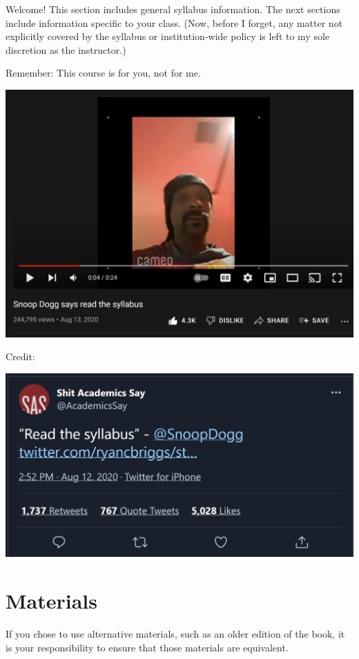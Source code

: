 Welcome! This section includes general syllabus information. The next sections include information specific to your class. (Now, before I forget, any matter not explicitly covered by the syllabus or institution-wide policy is left to my sole discretion as the instructor.)

Remember: This course is for you, not for me.

\includegraphics[width=29.86in]{img/snoop}

Credit:

\includegraphics[width=19.31in]{img/AcademicsSaystatus}

\hypertarget{materials}{%
\section{Materials}\label{materials}}

If you chose to use alternative materials, such as an older edition of the book, it is your responsibility to ensure that those materials are equivalent.

